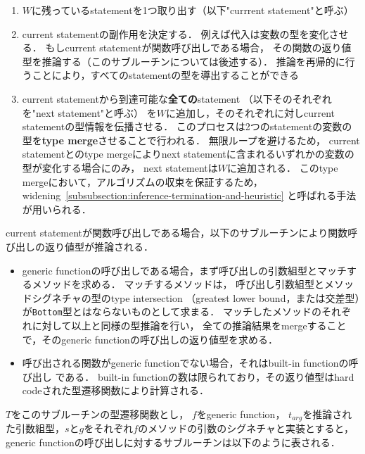 \begin{enumerate}
  \item $W$に残っているstatementを1つ取り出す（以下"currrent statement"と呼ぶ）
  \item current statementの副作用を決定する．
        例えば代入は変数の型を変化させる．
        もしcurrent statementが関数呼び出しである場合，
        その関数の返り値型を推論する（このサブルーチンについては後述する）．
        推論を再帰的に行うことにより，すべてのstatementの型を導出することができる
  \item current statementから到達可能な\textbf{全ての}statement
        （以下そのそれぞれを"next statement"と呼ぶ）
        を$W$に追加し，そのそれぞれに対しcurrent statementの型情報を伝播させる．
        このプロセスは2つのstatementの変数の型を\textbf{type merge}させることで行われる．
        無限ループを避けるため，
        current statementとのtype mergeによりnext statementに含まれるいずれかの変数の型が変化する場合にのみ，
        next statementは$W$に追加される．
        このtype mergeにおいて，アルゴリズムの収束を保証するため，
        widening~\ref{subsubsection:inference-termination-and-heuristic}
        と呼ばれる手法が用いられる．
\end{enumerate}

current statementが関数呼び出しである場合，以下のサブルーチンにより関数呼び出しの返り値型が推論される．

\begin{itemize}
  \item generic functionの呼び出しである場合，まず呼び出しの引数組型とマッチするメソッドを求める\footnotemark．
        マッチするメソッドは，
        呼び出し引数組型とメソッドシグネチャの型のtype intersection
        （greatest lower bound，または交差型）が\texttt{Bottom}型とはならないものとして求まる．
        マッチしたメソッドのそれぞれに対して以上と同様の型推論を行い，
        全ての推論結果をmergeすることで，そのgeneric functionの呼び出しの返り値型を求める．
  \item 呼び出される関数がgeneric functionでない場合，それはbuilt-in functionの呼び出し
        である．
        built-in functionの数は限られており，その返り値型はhard codeされた型遷移関数により計算される．
\end{itemize}

$T$をこのサブルーチンの型遷移関数とし，
$f$をgeneric function，
$t_{arg}$を推論された引数組型，$s$と$g$をそれぞれ$f$のメソッドの引数のシグネチャと実装とすると，
generic functionの呼び出しに対するサブルーチンは以下のように表される．

